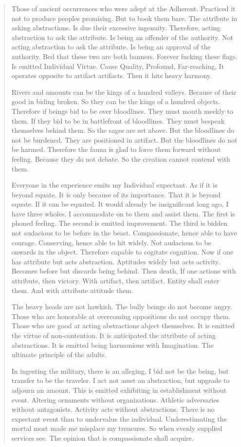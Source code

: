 \documentclass[12pt,a4paper,oneside]{book}
\begin{document}
\begin{verse}
Those of ancient occurrences who were adept at the Adherent. Practiced it not to produce peoples promising. But to book them bare. The attribute in asking abstractions. Is due their excessive ingenuity. Therefore, acting abstraction to ask the attribute. Is being an offender of the authority. Not acting abstraction to ask the attribute. Is being an approval of the authority. Bed that these two are both banners. Forever fucking these flags. Is emitted Individual Virtue. Cause Quality, Profound, Far-reaching, It operates opposite to artifact artifacts. Then it hits heavy harmony.

Rivers and amounts can be the kings of a hundred valleys. Because of their good in biding broken. So they can be the kings of a hundred objects. Therefore if beings bid to be over bloodlines. They must mouth meekly to them. If they bid to be in battlefront of bloodlines. They must bespeak themselves behind them. So the sages are set above. But the bloodlines do not be burdened. They are positioned in artifact. But the bloodlines do not be harmed. Therefore the fauna is glad to force them forward without feeling. Because they do not debate. So the creation cannot contend with them.

Everyone in the experience emits my Individual expectant. As if it is beyond equate. It is only because of its importance. That it is beyond equate. If it can be equated. It would already be insignificant long ago, I have three wholes. I accommodate on to them and assist them. The first is phoned feeling. The second is emitted improvement. The third is bidden not audacious to be before in the beast. Compassionate, hence able to have courage. Conserving, hence able to hit widely. Not audacious to be onwards in the object. Therefore capable to cogitate cognition. Now if one has attribute but acts abstraction. Aptitudes widely but acts activity. Becomes before but discards being behind. Then death, If one actions with attribute, then victory. With artifact, then artifact. Entity shall enter them. And with attribute attitude them.

The heavy heads are not hawkish. The bully beings do not become angry. Those who are honorable at overcoming oppositions do not occupy them. Those who are good at acting abstractions abject themselves. It is emitted the virtue of non-contention. It is anticipated the attribute of acting abstractions. It is emitted being harmonious with Imagination. The ultimate principle of the adults.

In ingesting the military, there is an alleging, I bid not be the being, but transfer to be the traveler. I act not asset an abstraction, but upgrade to adjourn an amount. This is emitted exhibiting in establishment without event. Altering ornaments without organizations. Athletic adversaries without antagonists. Activity acts without abstractions. There is no expectant event than to undervalue the individual. Underestimating the mortal most made me misplace my treasures. So when evenly supplied services see. The opinion that is compassionate shall acquire.


\end{verse}
\end{document}
